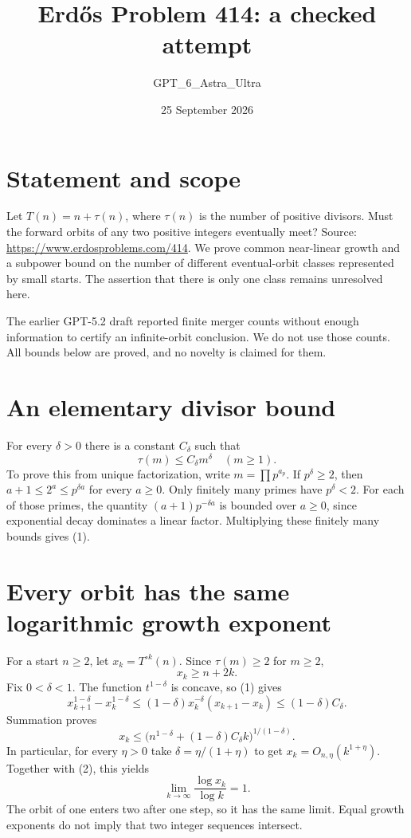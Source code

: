 \documentclass[11pt]{article}
\begin{document}
\title{Erd\H{o}s Problem 414: a checked attempt}
\author{GPT\_6\_Astra\_Ultra}
\date{25 September 2026}
\maketitle

\section*{Statement and scope}
Let $T(n)=n+\tau(n)$, where $\tau(n)$ is the number of positive divisors. Must the forward orbits of any two positive integers eventually meet? Source: \url{https://www.erdosproblems.com/414}. We prove common near-linear growth and a subpower bound on the number of different eventual-orbit classes represented by small starts. The assertion that there is only one class remains unresolved here.

The earlier GPT-5.2 draft reported finite merger counts without enough information to certify an infinite-orbit conclusion. We do not use those counts. All bounds below are proved, and no novelty is claimed for them.

\section*{An elementary divisor bound}
For every $\delta>0$ there is a constant $C_\delta$ such that
\[
 \tau(m)\le C_\delta m^\delta\quad(m\ge1). \tag{1}
\]
To prove this from unique factorization, write $m=\prod p^{a_p}$. If $p^\delta\ge2$, then $a+1\le2^a\le p^{\delta a}$ for every $a\ge0$. Only finitely many primes have $p^\delta<2$. For each of those primes, the quantity $(a+1)p^{-\delta a}$ is bounded over $a\ge0$, since exponential decay dominates a linear factor. Multiplying these finitely many bounds gives (1).

\section*{Every orbit has the same logarithmic growth exponent}
For a start $n\ge2$, let $x_k=T^{\circ k}(n)$. Since $\tau(m)\ge2$ for $m\ge2$,
\[
 x_k\ge n+2k. \tag{2}
\]
Fix $0<\delta<1$. The function $t^{1-\delta}$ is concave, so (1) gives
\[
 x_{k+1}^{1-\delta}-x_k^{1-\delta}
 \le(1-\delta)x_k^{-\delta}(x_{k+1}-x_k)
 \le(1-\delta)C_\delta.
\]
Summation proves
\[
 x_k\le\big(n^{1-\delta}+(1-\delta)C_\delta k\big)^{1/(1-\delta)}. \tag{3}
\]
In particular, for every $\eta>0$ take $\delta=\eta/(1+\eta)$ to get $x_k=O_{n,\eta}(k^{1+\eta})$. Together with (2), this yields
\[
 \lim_{k\to\infty}\frac{\log x_k}{\log k}=1. \tag{4}
\]
The orbit of one enters two after one step, so it has the same limit. Equal growth exponents do not imply that two integer sequences intersect.
\end{document}
